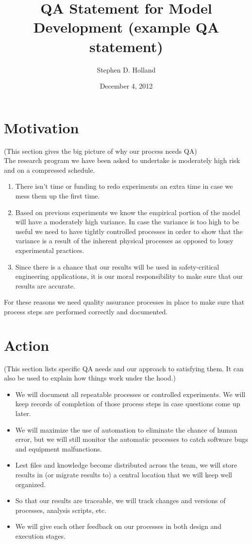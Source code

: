 \documentclass{QAstatement}
\begin{document}
\title{QA Statement for Model Development (example QA statement)}
\author{Stephen D. Holland}
\date{December 4, 2012}

\maketitle

\section*{Motivation}
{\small (This section gives the big picture of why our process needs QA)} \\
The research program we have been asked to undertake is moderately 
high risk and on a compressed schedule. 
\begin{enumerate}
  \item There isn't time or funding to redo experiments an extra time in case we mess them up the first time. 
  \item Based on previous experiments we know the empirical portion of the 
model will have a moderately high variance. In case the variance is too 
high to be useful we need to have tightly controlled processes in order
to show that the variance is a result of the inherent physical processes
 as opposed to lousy experimental practices. 
  \item Since there is a chance that our results will be used in 
safety-critical engineering applications, it is our moral responsibility
to make sure that our results are accurate. 
\end{enumerate}
For these reasons we need quality assurance processes in place to make
sure that process steps are performed correctly and documented. 

\section*{Action}
{\small (This section lists specific QA needs and our 
approach to satisfying them. It can also be used to explain
how things work under the hood.)} \\
\begin{itemize}
\item We will document all repeatable processes or
  controlled experiments. We will keep records of completion of those process
  steps in case questions come up later. 
\item We will maximize the use of automation to eliminate the chance of 
human error, but we will still monitor the automatic processes to catch software bugs and equipment malfunctions.
\item Lest files and knowledge become distributed across the team, we
  will store results in (or migrate results to) a central location
  that we will keep well organized.
\item So that our results are traceable, we will track changes and versions of processes, analysis scripts, etc. 
\item We will give each other feedback on our processes in both design and execution stages. 
\end{itemize}
\end{document}
